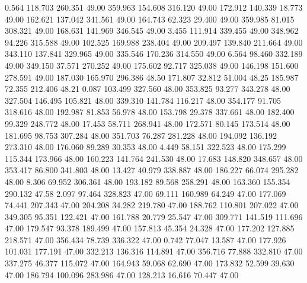    0.564  118.703  260.351        49.00
 359.963  154.608  316.120        49.00
 172.912  140.339   18.773        49.00
 162.621  137.042  341.561        49.00
 164.743   62.323   29.400        49.00
 359.985   81.015  308.321        49.00
 168.631  141.969  346.545        49.00
   3.455  111.914  339.455        49.00
 348.962   94.226  315.588        49.00
 102.525  169.988  238.404        49.00
 209.497  139.840  211.664        49.00
 343.110  137.841  329.965        49.00
 335.546  170.236  314.550        49.00
   6.564   98.460  332.189        49.00
 349.150   37.571  270.252        49.00
 175.602   92.717  325.038        49.00
 146.198  151.600  278.591        49.00
 187.030  165.970  296.386        48.50
 171.807   32.812   51.004        48.25
 185.987   72.355  212.406        48.21
   0.087  103.499  327.560        48.00
 353.825   93.277  343.278        48.00
 327.504  146.495  105.821        48.00
 339.310  141.784  116.217        48.00
 354.177   91.705  318.616        48.00
 192.987   81.853   56.978        48.00
 153.798   29.378  337.661        48.00
 182.400   99.329  248.772        48.00
  17.453   58.711  268.941        48.00
 172.571   80.145  173.514        48.00
 181.695   98.753  307.284        48.00
 351.703   76.287  281.228        48.00
 194.092  136.192  273.310        48.00
 176.060   89.289   30.353        48.00
   4.449   58.151  322.523        48.00
 175.299  115.344  173.966        48.00
 160.223  141.764  241.530        48.00
  17.683  148.820  348.657        48.00
 353.417   86.800  341.803        48.00
  13.427   40.979  338.887        48.00
 186.227   66.074  295.282        48.00
   8.306   69.952  306.361        48.00
 193.182   89.568  258.291        48.00
 163.360  155.354  290.132        47.58
   2.097   97.464  328.823        47.00
  69.111  160.989   64.249        47.00
 177.069   74.441  207.343        47.00
 204.208   34.282  219.780        47.00
 188.762  110.801  207.022        47.00
 349.305   95.351  122.421        47.00
 161.788   20.779   25.547        47.00
 309.771  141.519  111.696        47.00
 179.547   93.378  189.499        47.00
 157.813   45.354   24.328        47.00
 177.202  127.885  218.571        47.00
 356.434   78.739  336.322        47.00
   0.742   77.047   13.587        47.00
 177.926  101.031  177.191        47.00
 332.213  136.316  114.891        47.00
 356.716   77.888  332.810        47.00
 337.275   46.377  115.072        47.00
 164.943   59.068   62.690        47.00
 173.832   52.599   39.630        47.00
 186.794  100.096  283.986        47.00
 128.213   16.616   70.447        47.00
